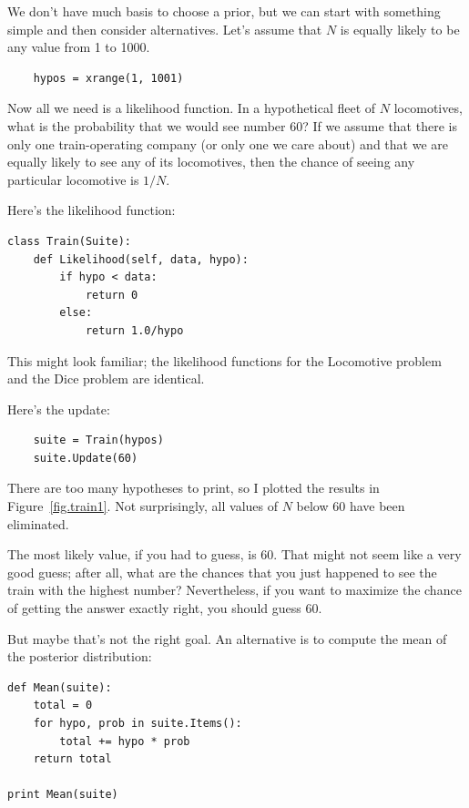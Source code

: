 \documentclass[12pt]{book}
\begin{document}
We don't have much basis to choose a prior, but we can start with
something simple and then consider alternatives.  Let's assume that
$N$ is equally likely to be any value from 1 to 1000.

\begin{verbatim}
    hypos = xrange(1, 1001)
\end{verbatim}

Now all we need is a likelihood function.  In a hypothetical fleet of
$N$ locomotives, what is the probability that we would see number 60?
If we assume that there is only one train-operating company (or only
one we care about) and that we are equally likely to see any of its
locomotives, then the chance of seeing any particular locomotive is
$1/N$.

Here's the likelihood function:

\begin{verbatim}
class Train(Suite):
    def Likelihood(self, data, hypo):
        if hypo < data:
            return 0
        else:
            return 1.0/hypo
\end{verbatim}

This might look familiar; the likelihood functions for the Locomotive
problem and the Dice problem are identical.

Here's the update:

\begin{verbatim}
    suite = Train(hypos)
    suite.Update(60)
\end{verbatim}

There are too many hypotheses to print, so I plotted the
results in Figure~\ref{fig.train1}.  Not surprisingly, all
values of $N$ below 60 have been eliminated.

The most likely
value, if you had to guess, is 60.  That might not seem like
a very good guess; after all, what are the chances that you just
happened to see the train with the highest number?
Nevertheless, if you want to maximize the chance of getting
the answer exactly right, you should guess 60.

But maybe that's
not the right goal.  An alternative is to compute the
mean of the posterior distribution:

\begin{verbatim}
def Mean(suite):
    total = 0
    for hypo, prob in suite.Items():
        total += hypo * prob
    return total

print Mean(suite)
\end{verbatim}
\end{document}
